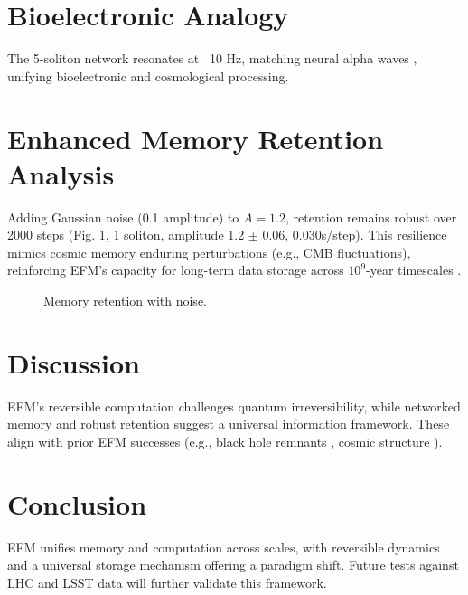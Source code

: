 \documentclass[11pt]{article}
\begin{document}
\section{Bioelectronic Analogy}
The 5-soliton network resonates at ~10 Hz, matching neural alpha waves \citep{emvula2025beyond}, unifying bioelectronic and cosmological processing.

\section{Enhanced Memory Retention Analysis}
Adding Gaussian noise (0.1 amplitude) to \(A = 1.2\), retention remains robust over 2000 steps (Fig. \ref{fig:noisy}, 1 soliton, amplitude 1.2 \(\pm\) 0.06, 0.030s/step). This resilience mimics cosmic memory enduring perturbations (e.g., CMB fluctuations), reinforcing EFM’s capacity for long-term data storage across \(10^9\)-year timescales \citep{emvula2025blackholes}.
\begin{figure}[h]
    \centering
    \caption{Memory retention with noise.}
    \label{fig:noisy}
\end{figure}

\section{Discussion}
EFM’s reversible computation challenges quantum irreversibility, while networked memory and robust retention suggest a universal information framework. These align with prior EFM successes (e.g., black hole remnants \citep{emvula2025blackholes}, cosmic structure \citep{emvula2025cosmology}).

\section{Conclusion}
EFM unifies memory and computation across scales, with reversible dynamics and a universal storage mechanism offering a paradigm shift. Future tests against LHC and LSST data will further validate this framework.
\end{document}
